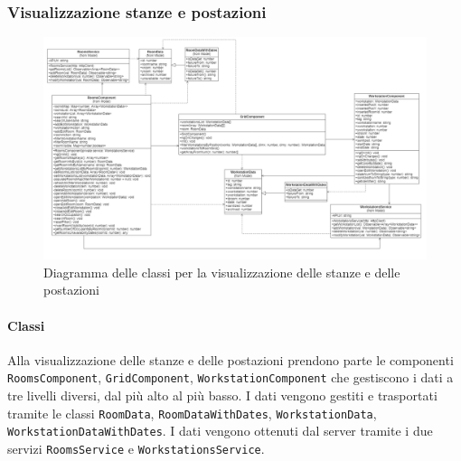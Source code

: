 \subsubsection{Visualizzazione stanze e postazioni}
\begin{figure}[H]
	\centering
	\includegraphics[width=18cm]{res/images/webapp-visualStanzePostazioni-diagrammaClassi.png}
	\caption{Diagramma delle classi per la visualizzazione delle stanze e delle postazioni}
	\label{fig:DiagrammaClassiVisualStanzePostazioni}
\end{figure}

\paragraph{Classi}
Alla visualizzazione delle stanze e delle postazioni prendono parte le componenti \texttt{RoomsComponent}, \texttt{GridComponent}, \texttt{WorkstationComponent} che gestiscono i dati a tre livelli diversi, dal più alto al più basso.
I dati vengono gestiti e trasportati tramite le classi \texttt{RoomData}, \texttt{RoomDataWithDates}, \texttt{WorkstationData}, \texttt{WorkstationDataWithDates}.
I dati vengono ottenuti dal server tramite i due servizi \texttt{RoomsService} e \texttt{WorkstationsService}.

